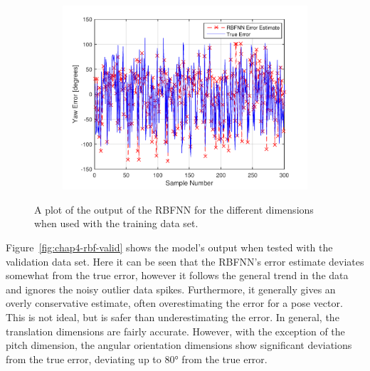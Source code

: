\begin{figure}
\begin{subfigure}{0.3\textwidth}
    \includegraphics[width=\textwidth]{figures/chapter4/yaw_train}
    \caption{}
  \end{subfigure}
  \caption[The output of the RBFNN when used with the training set input.]{A plot of the output of the RBFNN for the different dimensions when used with the training data set.}
  \label{fig:chap4-rbf-train}
\end{figure}

Figure~\ref{fig:chap4-rbf-valid} shows the model's output when tested with the validation data set. Here it can be seen that the RBFNN's error estimate deviates somewhat from the true error, however it follows the general trend in the data and ignores the noisy outlier data spikes. Furthermore, it generally gives an overly conservative estimate, often overestimating the error for a pose vector. This is not ideal, but is safer than underestimating the error. In general, the translation dimensions are fairly accurate. However, with the exception of the pitch dimension, the angular orientation dimensions show significant deviations from the true error, deviating up to $\ang{80}$ from the true error. 


